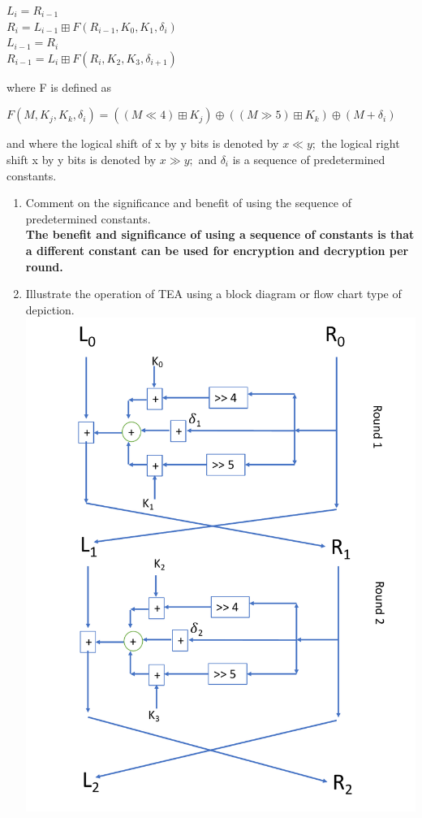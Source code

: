 \documentclass[12pt]{article}
\begin{document}
\begin{enumerate}
{\begin{center}
$L_i = R_{i-1}$\\
$R_i = L_{i-1} \boxplus F(R_{i-1}, K_0, K_1, \delta_i)$\\
$L_{i-1} = R_i$\\
$R_{i-1} = L_i \boxplus F(R_i, K_2, K_3, \delta_{i+1})$
\end{center}
where F is defined as
\begin{center}
$F(M, K_j, K_k, \delta_i) = ((M\ll  4) \boxplus K_j) \oplus ((M \gg 5) \boxplus K_k) \oplus (M+\delta_i)$
\end{center} }
and where the logical shift of x by y bits is denoted by $x \ll y;$ the logical right shift x by y bits is denoted by $x \gg y;$ and $\delta_i$ is a sequence of predetermined constants.
\begin{enumerate}
  \item {Comment on the significance and benefit of using the sequence of predetermined constants.} \\

  \textbf{The benefit and significance of using a sequence of constants is that a different constant can be used for encryption and decryption per round.}

  \item {Illustrate the operation of TEA using a block diagram or flow chart type of depiction.} \\

  \includegraphics[scale=0.5]{encryption.pdf}


\end{enumerate}
\end{enumerate}
\end{document}
